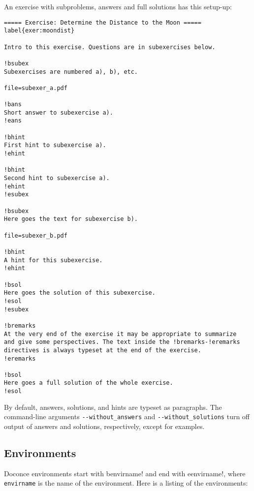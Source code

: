 \documentclass[%
oneside,                 %
final,                   %
10pt]{article}
\begin{document}
An exercise with subproblems, answers and full solutions has this
setup-up:

\begin{Verbatim}[numbers=none,fontsize=\fontsize{9pt}{9pt},baselinestretch=0.85,xleftmargin=0mm]
===== Exercise: Determine the Distance to the Moon =====
label{exer:moondist}

Intro to this exercise. Questions are in subexercises below.

!bsubex
Subexercises are numbered a), b), etc.

file=subexer_a.pdf

!bans
Short answer to subexercise a).
!eans

!bhint
First hint to subexercise a).
!ehint

!bhint
Second hint to subexercise a).
!ehint
!esubex

!bsubex
Here goes the text for subexercise b).

file=subexer_b.pdf

!bhint
A hint for this subexercise.
!ehint

!bsol
Here goes the solution of this subexercise.
!esol
!esubex

!bremarks
At the very end of the exercise it may be appropriate to summarize
and give some perspectives. The text inside the !bremarks-!eremarks
directives is always typeset at the end of the exercise.
!eremarks

!bsol
Here goes a full solution of the whole exercise.
!esol

\end{Verbatim}
By default, answers, solutions, and hints are typeset as paragraphs.
The command-line arguments \Verb!--without_answers! and \Verb!--without_solutions!
turn off output of answers and solutions, respectively, except for
examples.


\subsection{Environments}

Doconce environments start with \Verb!!benvirname! and end with \Verb!!eenvirname!,
where \Verb!envirname! is the name of the environment. Here is a listing of
the environments:
\end{document}
